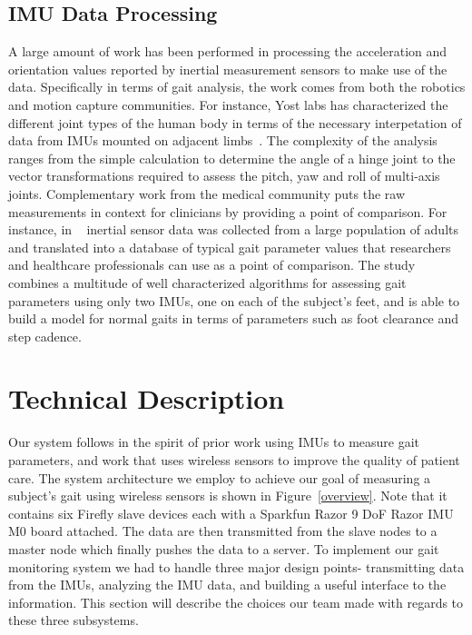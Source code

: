 \documentclass[conference]{IEEEtran}
\begin{document}
\subsection{IMU Data Processing}
A large amount of work has been performed in processing the acceleration and orientation
values reported by inertial measurement sensors to make use of the data. Specifically in
terms of gait analysis, the work comes from both the robotics and motion capture
communities. 
For instance, Yost labs has characterized the different joint types of the
human body in terms of the necessary interpetation of data from IMUs mounted on adjacent
limbs~\cite{yost}. The complexity of the analysis ranges from the simple calculation to
determine the angle of a hinge joint to the vector transformations required to assess the
pitch, yaw and roll of multi-axis joints. Complementary work from the medical community
puts the raw measurements in context for clinicians by providing a point of comparison.
For instance, in ~\cite{pop} inertial sensor data was collected from a large population
of adults and translated into a database of typical gait parameter values that researchers
and healthcare professionals can use as a point of comparison. The study combines a
multitude of well characterized algorithms for assessing gait parameters using only two
IMUs, one on each of the subject's feet, and is able to build a model for normal gaits
in terms of parameters such as foot clearance and step cadence. 


\section{Technical Description}
Our system follows in the spirit of prior work using IMUs to measure gait parameters, and
work that uses wireless sensors to improve the quality of patient care. The system
architecture we employ to achieve our goal of measuring a subject's gait using wireless
sensors is shown in Figure~\ref{overview}. Note that it contains six Firefly slave devices
each with a Sparkfun Razor 9 DoF Razor IMU M0 board attached. The data are then
transmitted from the slave nodes to a master node which finally pushes the data to a
server. To implement our gait monitoring system we had to handle three major design
points- transmitting data from the IMUs, analyzing the IMU data, and building a useful
interface to the information. This section will describe the choices our team made with
regards to these three subsystems. 
\end{document}
